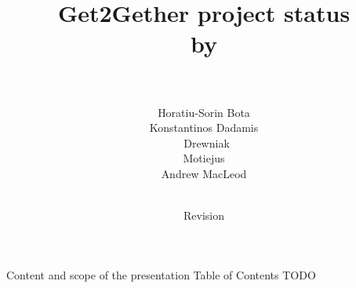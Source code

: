 \documentclass{beamer}
\title[get2gether]{Get2Gether project status\\ by\\\dnd\ }
\author{Horatiu-Sorin Bota \\
		Konstantinos Dadamis \\
		\pawel\ Drewniak \\
		Motiejus \jakstys \\
		Andrew MacLeod}
\date{\GITAuthorDate\\
Revision \GITAbrHash
}
\begin{document}
\begin{frame}
\titlepage
\end{frame}

\begin{frame}{Content and scope of the presentation}
Table of Contents TODO
\end{frame}
\end{document}
